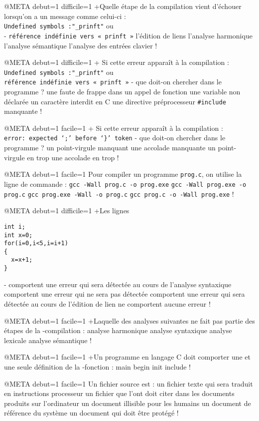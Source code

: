 @META debut=1 difficile=1
+Quelle étape de la compilation vient d'échouer lorsqu'on a un message
 comme celui-ci : \\
 \verb+Undefined symbols :"_prinft"+ ou \\
- \verb+référence indéfinie vers « prinft »+
 l'édition de liens
 l'analyse harmonique
 l'analyse sémantique
 l'analyse des entrées clavier
!

@META debut=1 difficile=1
+ Si cette erreur apparaît à la compilation : \\
 \verb+Undefined symbols :"_prinft"+ ou \\
 \verb+référence indéfinie vers « prinft »+
- que doit-on chercher dans le programme ?
  une faute de frappe dans un appel de fonction
  une variable non déclarée
  un caractère interdit en C
  une directive préprocesseur \verb+#include+ manquante
!

@META debut=1 facile=1
+ Si cette erreur apparaît à la compilation : \\
\verb+error: expected ‘;’ before ‘}’ token+ 
- que doit-on chercher dans le programme ?
 un point-virgule manquant
 une accolade manquante
 un point-virgule en trop
 une accolade en trop
!

@META debut=1 facile=1
Pour compiler un programme \verb|prog.c|, on utilise la ligne de commande : 
 \verb|gcc -Wall prog.c -o prog.exe|
 \verb|gcc -Wall prog.exe -o prog.c|
 \verb|gcc prog.exe -Wall -o prog.c|
 \verb|gcc prog.c -o -Wall prog.exe|
!

@META debut=1 difficile=1
+Les lignes
\begin{verbatim}
int i;
int x=0;
for(i=0,i<5,i=i+1)
{
  x=x+1;
}
\end{verbatim}
-
 comportent une erreur qui sera détectée au cours de l'analyse syntaxique
 comportent une erreur qui ne sera pas détectée
 comportent une erreur qui sera détectée au cours de l'édition de lien
 ne comportent aucune erreur
!

@META debut=1 facile=1
+Laquelle des analyses suivantes ne fait pas partie des étapes de la
-compilation :
 analyse harmonique
 analyse syntaxique
 analyse lexicale
 analyse sémantique
!

@META debut=1 facile=1
+Un programme en langage C doit comporter une et une seule définition de la
-fonction :
 main
 begin
 init
 include
!

@META debut=1 facile=1
Un fichier source est :
 un fichier texte qui sera traduit en instructions processeur
 un fichier que l'ont doit citer dans les documents produits sur l'ordinateur
 un document illisible pour les humains
 un document de référence du système
 un document qui doit être protégé
!

